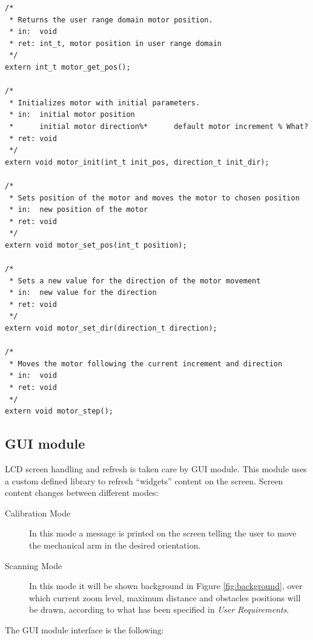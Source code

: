 \begin{verbatim}
/*
 * Returns the user range domain motor position.
 * in:  void
 * ret: int_t, motor position in user range domain
 */
extern int_t motor_get_pos();

/*
 * Initializes motor with initial parameters.
 * in:  initial motor position
 *      initial motor direction%*      default motor increment % What?
 * ret: void
 */
extern void motor_init(int_t init_pos, direction_t init_dir);

/*
 * Sets position of the motor and moves the motor to chosen position
 * in:  new position of the motor
 * ret: void
 */
extern void motor_set_pos(int_t position);

/*
 * Sets a new value for the direction of the motor movement
 * in:  new value for the direction
 * ret: void
 */
extern void motor_set_dir(direction_t direction);

/*
 * Moves the motor following the current increment and direction
 * in:  void
 * ret: void
 */
extern void motor_step();
\end{verbatim}


\subsection{GUI module}

LCD screen handling and refresh is taken care by GUI module. This module uses a custom defined library to refresh ``widgets'' content on the screen. Screen content changes between different modes:
\begin{description}
    \item[Calibration Mode] In this mode a message is printed on the screen telling the user to move the mechanical arm in the desired orientation.
    \item[Scanning Mode] In this mode it will be shown background in Figure \ref{fig:background}, over which current zoom level, maximum distance and obstacles positions will be drawn, according to what has been specified in {\em User Requirements}.
\end{description}

The GUI module interface is the following:


